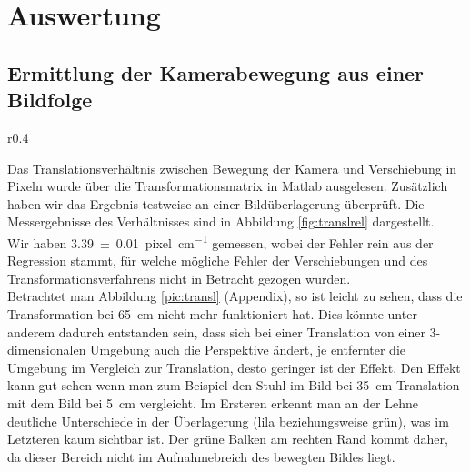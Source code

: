\section{Auswertung}
\subsection{Ermittlung der Kamerabewegung aus einer Bildfolge}
\begin{wrapfigure}{r}{0.4\textwidth}
  \vspace{-10pt}
  \caption{}
  \label{fig:translrel}
  \vspace{-10pt}
  \resizebox{\linewidth}{!}{}
  \vspace{-30pt}
\end{wrapfigure}
Das Translationsverhältnis zwischen Bewegung der Kamera und Verschiebung in
Pixeln wurde über die Transformationsmatrix in Matlab ausgelesen. Zusätzlich
haben wir das Ergebnis testweise an einer Bildüberlagerung überprüft. Die
Messergebnisse des Verhältnisses sind in Abbildung \ref{fig:translrel}
dargestellt.\\
Wir haben \SI{3.39(1)}{pixel\per\centi\meter} gemessen, wobei der Fehler rein
aus der Regression stammt, für welche mögliche Fehler der Verschiebungen und
des Transformationsverfahrens nicht in Betracht gezogen wurden.\\
Betrachtet man Abbildung \ref{pic:transl} (Appendix), so ist leicht zu sehen,
dass die Transformation bei \SI{65}{\centi\meter} nicht mehr funktioniert hat.
Dies könnte unter anderem dadurch entstanden sein, dass sich bei einer
Translation von einer 3-dimensionalen Umgebung auch die Perspektive ändert, je
entfernter die Umgebung im Vergleich zur Translation, desto geringer ist der
Effekt. Den Effekt kann gut sehen wenn man zum Beispiel den Stuhl im Bild bei
\SI{35}{\centi\meter} Translation mit dem Bild bei \SI{5}{\centi\meter}
vergleicht. Im Ersteren erkennt man an der Lehne deutliche Unterschiede in der
Überlagerung (lila beziehungsweise grün), was im Letzteren kaum sichtbar ist.
Der grüne Balken am rechten Rand kommt daher, da dieser Bereich nicht im
Aufnahmebreich des bewegten Bildes liegt.

